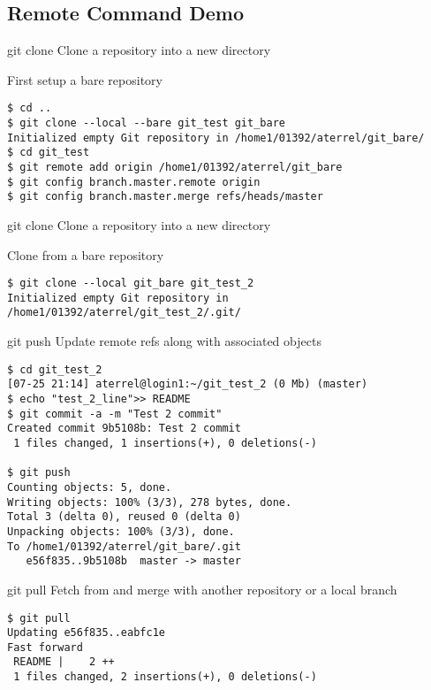 \subsection{Remote Command Demo}

\begin{frame}[fragile]
\begin{block}{git clone}
Clone a repository into a new directory
\end{block}

First setup a bare repository
\begin{verbatim}
$ cd ..
$ git clone --local --bare git_test git_bare
Initialized empty Git repository in /home1/01392/aterrel/git_bare/
$ cd git_test
$ git remote add origin /home1/01392/aterrel/git_bare
$ git config branch.master.remote origin
$ git config branch.master.merge refs/heads/master
\end{verbatim}
\end{frame}

\begin{frame}[fragile]
\begin{block}{git clone}
Clone a repository into a new directory
\end{block}

Clone from a bare repository
\begin{verbatim}
$ git clone --local git_bare git_test_2
Initialized empty Git repository in /home1/01392/aterrel/git_test_2/.git/
\end{verbatim}
\end{frame}

\begin{frame}[fragile]
\begin{block}{git push}
Update remote refs along with associated objects
\end{block}
\begin{verbatim}
$ cd git_test_2
[07-25 21:14] aterrel@login1:~/git_test_2 (0 Mb) (master)
$ echo "test_2_line">> README
$ git commit -a -m "Test 2 commit"
Created commit 9b5108b: Test 2 commit
 1 files changed, 1 insertions(+), 0 deletions(-)

$ git push
Counting objects: 5, done.
Writing objects: 100% (3/3), 278 bytes, done.
Total 3 (delta 0), reused 0 (delta 0)
Unpacking objects: 100% (3/3), done.
To /home1/01392/aterrel/git_bare/.git
   e56f835..9b5108b  master -> master
\end{verbatim}
\end{frame}


\begin{frame}[fragile]
\begin{block}{git pull}
Fetch from and merge with another repository or a local branch
\end{block}
\begin{verbatim}
$ git pull
Updating e56f835..eabfc1e
Fast forward
 README |    2 ++
 1 files changed, 2 insertions(+), 0 deletions(-)
\end{verbatim}
\end{frame}


